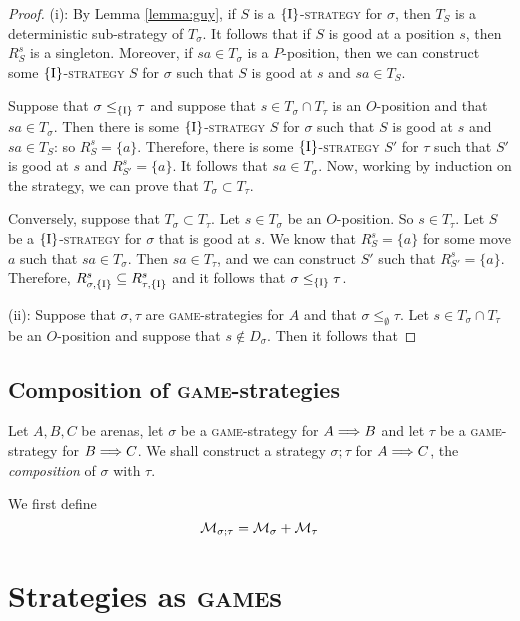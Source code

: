 \documentclass{article}
\newcommand{\game}{\textsc{game}}
\newcommand{\strategy}{\textsc{strategy}}
\begin{document}
\begin{proof}
  (i): By Lemma \ref{lemma:guy}, if $S$ is a $\{\RN{1}\}$-\strategy{} for $\sigma$, then $T_S$ is a deterministic sub-strategy of $T_\sigma$.  
  It follows that if $S$ is good at a position $s$, then $R_S^s$ is a singleton.  
  Moreover, if $sa\in T_\sigma$ is a $P$-position, then we can construct some $\{\RN{1}\}$-\strategy{} $S$ for $\sigma$ such that $S$ is good at $s$ and $sa\in T_S$.  
  
  Suppose that $\sigma\le_{\{\RN{1}\}}\tau$ and suppose that $s\in T_\sigma\cap T_\tau$ is an $O$-position and that $sa\in T_\sigma$.  
  Then there is some $\{\RN{1}\}$-\strategy{} $S$ for $\sigma$ such that $S$ is good at $s$ and $sa\in T_S$: so $R_S^s=\{a\}$.  
  Therefore, there is some $\{\RN{1}\}$-\strategy{} $S'$ for $\tau$ such that $S'$ is good at $s$ and $R_{S'}^s=\{a\}$.  
  It follows that $sa\in T_\sigma$.  
  Now, working by induction on the strategy, we can prove that $T_\sigma\subset T_\tau$.  

  Conversely, suppose that $T_\sigma\subset T_\tau$.  
  Let $s\in T_\sigma$ be an $O$-position.  
  So $s\in T_\tau$.  
  Let $S$ be a $\{\RN{1}\}$-\strategy{} for $\sigma$ that is good at $s$.  
  We know that $R_S^s = \{a\}$ for some move $a$ such that $sa\in T_\sigma$.  
  Then $sa\in T_\tau$, and we can construct $S'$ such that $R_{S'}^s=\{a\}$.  
  Therefore, $R_{\sigma,\{\RN{1}\}}^s\subset R_{\tau,\{\RN{1}\}}^s$ and it follows that $\sigma \le_{\{\RN{1}\}}\tau$.  

  (ii): Suppose that $\sigma,\tau$ are \game{}-strategies for $A$ and that $\sigma\le_{\emptyset}\tau$.  
  Let $s\in T_\sigma\cap T_\tau$ be an $O$-position and suppose that $s\not\in D_\sigma$.  
  Then it follows that 

\end{proof}

\subsection{Composition of \game{}-strategies}

Let $A,B,C$ be arenas, let $\sigma$ be a \game{}-strategy for $A\Longrightarrow B$ and let $\tau$ be a \game{}-strategy for $B\Longrightarrow C$.  
We shall construct a strategy $\sigma;\tau$ for $A\Longrightarrow C$, the \emph{composition} of $\sigma$ with $\tau$.  

We first define
\[
  \mathcal M_{\sigma;\tau}=\mathcal M_\sigma + \mathcal M_\tau
  \]

\section{Strategies as \game{}s}
\end{document}
